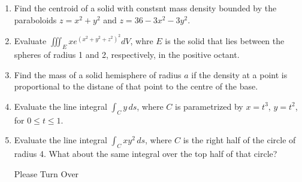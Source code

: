 \documentclass[12pt]{article}
\begin{document}
\begin{enumerate}
   
   
   
\item  Find the centroid of a solid with constsnt mass density bounded by the paraboloids $z=x^2+y^2$ and $z=36-3x^2-3y^2$. 
\vspace{-2pt}
   

   
\item  Evaluate $\iiint_E xe^{(x^2+y^2+z^2)^2} dV$, whre $E$ is the solid that lies between the spheres of radius 1 and 2, respectively, in
  the positive octant.
\vspace{-2pt}
   

   
\item Find the mass of a solid hemisphere of radius $a$ if the density at a point is proportional to the distane of that point to the
  centre of the base.
\vspace{-2pt}
   
 
\item Evaluate the line integral $\int_C y \, ds$, where $C$ is parametrized by $x=t^3$, $y=t^2$, for $0\leq t \leq 1$.
\vspace{-2pt}
   
\item Evaluate the line integral $\int_C xy^2 \, ds$, where $C$ is the right half of the circle of radius 4.
  What about the same integral over the top half of that circle?
\vspace{-2pt}\vfill

\hfill {{\color{red}\sc Please Turn Over}}


\end{enumerate}
\end{document}
